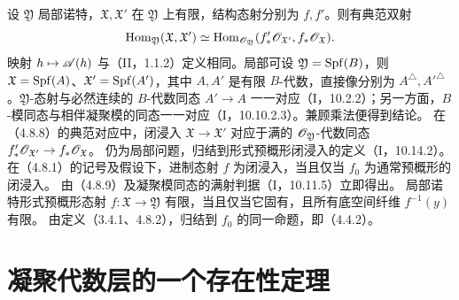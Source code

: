 设 $\mathfrak Y$ 局部诺特，$\mathfrak X,\mathfrak X'$ 在 $\mathfrak Y$ 上有限，结构态射分别为 $f,f'$。则有典范双射
\[
\operatorname{Hom}_{\mathfrak Y}(\mathfrak X,\mathfrak X')\simeq
\operatorname{Hom}_{\mathscr O_{\mathfrak Y}}(f'_*\mathscr O_{\mathfrak X'},f_*\mathscr O_{\mathfrak X}).
\]
\eproof
映射 $h\mapsto\mathscr A(h)$ 与（II，1.1.2）定义相同。局部可设 $\mathfrak Y=\operatorname{Spf}(B)$，则 $\mathfrak X=\operatorname{Spf}(A)$、$\mathfrak X'=\operatorname{Spf}(A')$，其中 $A,A'$ 是有限 $B$-代数，直接像分别为 $A^\triangle,A'^\triangle$。$\mathfrak Y$-态射与必然连续的 $B$-代数同态 $A'\to A$ 一一对应（I，10.2.2）；另一方面，$B$-模同态与相伴凝聚模的同态一一对应（I，10.10.2.3）。兼顾乘法便得到结论。\finishproof
{}
在（4.8.8）的典范对应中，闭浸入 $\mathfrak X\to\mathfrak X'$ 对应于满的 $\mathscr O_{\mathfrak Y}$-代数同态 $f'_*\mathscr O_{\mathfrak X'}\to f_*\mathscr O_{\mathfrak X}$。
\eproof
仍为局部问题，归结到形式预概形闭浸入的定义（I，10.14.2）。\finishproof
{}
在（4.8.1）的记号及假设下，进制态射 $f$ 为闭浸入，当且仅当 $f_0$ 为通常预概形的闭浸入。
\eproof
由（4.8.9）及凝聚模同态的满射判据（I，10.11.5）立即得出。\finishproof
{}
局部诺特形式预概形态射 $f:\mathfrak X\to\mathfrak Y$ 有限，当且仅当它固有，且所有底空间纤维 $f^{-1}(y)$ 有限。
\eproof
由定义（3.4.1、4.8.2），归结到 $f_0$ 的同一命题，即（4.4.2）。\finishproof\par

\section{凝聚代数层的一个存在性定理}
